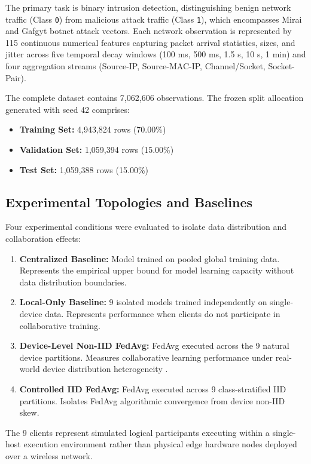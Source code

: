 \documentclass[11pt,a4paper]{article}
\begin{document}
The primary task is binary intrusion detection, distinguishing benign network traffic (Class \texttt{0}) from malicious attack traffic (Class \texttt{1}), which encompasses Mirai and Gafgyt botnet attack vectors. Each network observation is represented by 115 continuous numerical features capturing packet arrival statistics, sizes, and jitter across five temporal decay windows (100 ms, 500 ms, 1.5 s, 10 s, 1 min) and four aggregation streams (Source-IP, Source-MAC-IP, Channel/Socket, Socket-Pair).

The complete dataset contains 7,062,606 observations. The frozen split allocation generated with seed 42 comprises:

\begin{itemize}
    \item \textbf{Training Set:} 4,943,824 rows (70.00\%)
    \item \textbf{Validation Set:} 1,059,394 rows (15.00\%)
    \item \textbf{Test Set:} 1,059,388 rows (15.00\%)
\end{itemize}

\subsection{Experimental Topologies and Baselines}
Four experimental conditions were evaluated to isolate data distribution and collaboration effects:

\begin{enumerate}
    \item \textbf{Centralized Baseline:} Model trained on pooled global training data. Represents the empirical upper bound for model learning capacity without data distribution boundaries.
    \item \textbf{Local-Only Baseline:} 9 isolated models trained independently on single-device data. Represents performance when clients do not participate in collaborative training.
    \item \textbf{Device-Level Non-IID FedAvg:} FedAvg executed across the 9 natural device partitions. Measures collaborative learning performance under real-world device distribution heterogeneity \cite{ref5, ref6, ref7}.
    \item \textbf{Controlled IID FedAvg:} FedAvg executed across 9 class-stratified IID partitions. Isolates FedAvg algorithmic convergence from device non-IID skew.
\end{enumerate}

The 9 clients represent simulated logical participants executing within a single-host execution environment rather than physical edge hardware nodes deployed over a wireless network.
\end{document}
